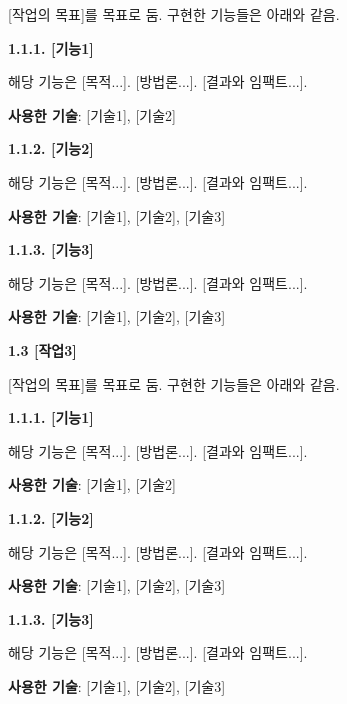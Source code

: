 \documentclass[letterpaper,11pt]{article}
\newcommand{\resumeSubProject}[2]{
  \item{
    {#1 \vspace{0pt}}
    {#2}
  }
}
\begin{document}
        {
        [작업의 목표]를 목표로 둠. 구현한 기능들은 아래와 같음. 
        
        \vspace{2mm}
        
        \textbf{1.1.1. [기능1] }
        
        해당 기능은 [목적...]. [방법론...]. [결과와 임팩트...].
        
        \textbf{사용한 기술}: [기술1], [기술2]
        
        \vspace{2mm}
        
        \textbf{1.1.2. [기능2]}
        
        해당 기능은 [목적...]. [방법론...]. [결과와 임팩트...].

        \textbf{사용한 기술}: [기술1], [기술2], [기술3]

        \vspace{2mm}
        
        \textbf{1.1.3. [기능3]}

        해당 기능은 [목적...]. [방법론...]. [결과와 임팩트...].
        
        \textbf{사용한 기술}: [기술1], [기술2], [기술3]
        
        \vspace{7mm}

        }

        \resumeSubProject{\textbf{1.3 [작업3]}}
        
       {
        [작업의 목표]를 목표로 둠. 구현한 기능들은 아래와 같음. 
        
        \vspace{2mm}
        
        \textbf{1.1.1. [기능1] }
        
        해당 기능은 [목적...]. [방법론...]. [결과와 임팩트...].
        
        \textbf{사용한 기술}: [기술1], [기술2]
        
        \vspace{2mm}
        
        \textbf{1.1.2. [기능2]}
        
        해당 기능은 [목적...]. [방법론...]. [결과와 임팩트...].

        \textbf{사용한 기술}: [기술1], [기술2], [기술3]

        \vspace{2mm}
        
        \textbf{1.1.3. [기능3]}

        해당 기능은 [목적...]. [방법론...]. [결과와 임팩트...].
        
        \textbf{사용한 기술}: [기술1], [기술2], [기술3]
        
        \vspace{4mm}
        }
\end{document}
